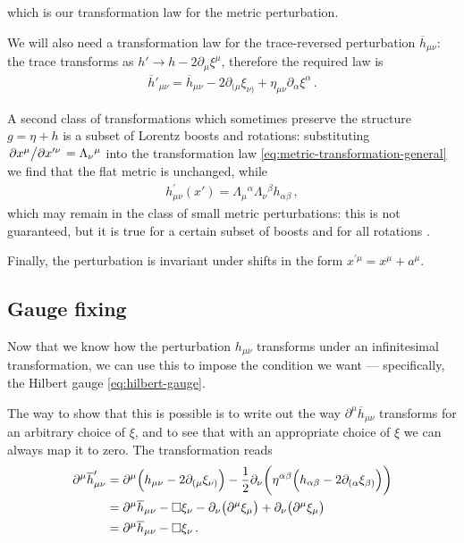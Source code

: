 \documentclass[main.tex]{subfiles}
\begin{document}
%
%
which is our transformation law for the metric perturbation. 

We will also need a transformation law for the trace-reversed perturbation \(\overline{h}_{\mu \nu }\): the trace transforms as \(h' \to h - 2 \partial_{\mu } \xi^{\mu }\), therefore the required law is 
%
\begin{align} \label{eq:perturbation-transformation-infinitesimal-tracereversed}
\overline{h}'_{\mu \nu } = \overline{h}_{\mu \nu } - 2 \partial_{(\mu } \xi_{\nu )} + \eta_{\mu \nu } \partial_{\alpha } \xi^{\alpha }
\,.
\end{align}


A second class of transformations which sometimes preserve the structure \(g = \eta + h\) is a subset of Lorentz boosts and rotations: substituting \(\pdv*{x^{\mu }}{x^{\prime \nu }} = \Lambda_\nu{}^{\mu }\) into the transformation law \eqref{eq:metric-transformation-general} we find that the flat metric is unchanged, while 
%
\begin{align}
h^{\prime }_{\mu \nu } ( x') = \Lambda_{\mu }{}^{\alpha }
\Lambda_{\nu }{}^{\beta } h_{\alpha \beta }
\,,
\end{align}
%
which may remain in the class of small metric perturbations: this is not guaranteed, but it is true for a certain subset of boosts and for all rotations \cite{maggioreGravitationalWavesVolume2007}. 

Finally, the perturbation is invariant under shifts in the form \(x^{\prime \mu }= x^{\mu } + a^{\mu }\). 

\subsection{Gauge fixing} \label{sec:gauge-fixing}

Now that we know how the perturbation \(h_{\mu \nu }\) transforms under an infinitesimal transformation, we can use this to impose the condition we want --- specifically, the Hilbert gauge \eqref{eq:hilbert-gauge}.

The way to show that this is possible is to write out the way \(\partial^{\mu } \overline{h}_{\mu \nu }\) transforms for an arbitrary choice of \(\xi \), and to see that with an appropriate choice of \(\xi \) we can always map it to zero. 
The transformation reads 
%
\begin{align}
\partial^{\mu } \overline{h}_{\mu \nu }' &= 
\partial^{\mu } \qty(h_{\mu \nu } - 2 \partial_{(\mu } \xi_{\nu )}) - \frac{1}{2} \partial_{\nu } \qty(\eta^{\alpha \beta } \qty(h_{\alpha \beta } - 2 \partial_{(\alpha } \xi_{\beta )}))  \\
&= \partial^{\mu } \overline{h}_{\mu \nu } - \square \xi_{\nu } - \partial_{\nu } \qty(\partial^{\mu } \xi_{\mu }) + \partial_{\nu } \qty(\partial^{\mu } \xi_{\mu })  \\
&= \partial^{\mu } \overline{h}_{\mu \nu } - \square \xi_{\nu }
\,. 
\end{align}
\end{document}

